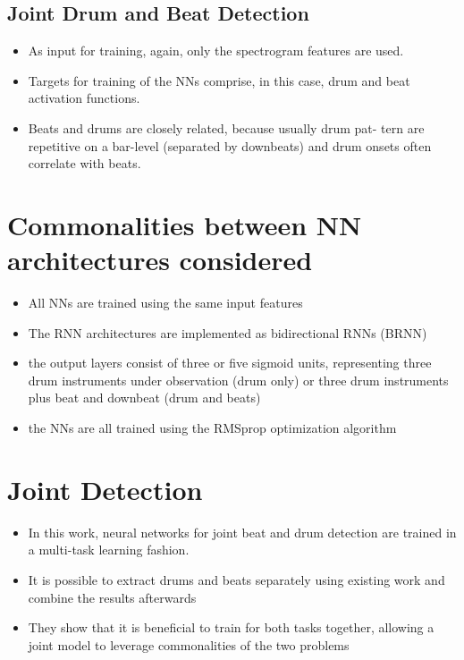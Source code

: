 \subsection*{Joint Drum and Beat Detection}
\begin{itemize}
\item As input for training, again, only the spectrogram features are used. 
\item Targets for training of the NNs comprise, in this case, drum and beat activation functions.
\item Beats and drums are closely related, because usually drum pat- tern are repetitive on a bar-level (separated by downbeats) and drum onsets often correlate with beats. 
\end{itemize}






\section*{Commonalities between NN architectures considered}
\begin{itemize}
\item All NNs are trained using the same input features
\item The RNN architectures are implemented as bidirectional RNNs (BRNN) 
\item the output layers consist of three or five sigmoid units, representing three drum instruments under observation (drum only) or three drum instruments plus beat and downbeat (drum and beats) 
\item the NNs are all trained using the RMSprop optimization algorithm 
\end{itemize}  


\section*{Joint Detection} 
\begin{itemize}
\item In this work, neural networks for joint beat and drum detection are trained in a multi-task learning fashion. 
\item It is possible to extract drums and beats separately using existing work and combine the results afterwards
\item They show that it is beneficial to train for both tasks together, allowing a joint model to leverage commonalities of the two problems 
\end{itemize}  


